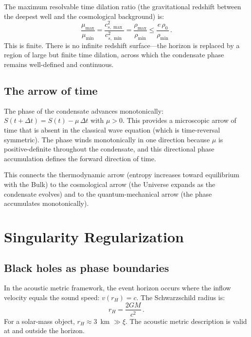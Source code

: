 \documentclass[12pt, a4paper]{article}
\begin{document}
The maximum resolvable time dilation ratio
(the gravitational redshift between the deepest
well and the cosmological background) is:
\begin{equation}
    \frac{\mu_{\max}}{\mu_{\min}}
    = \frac{c_{s,\max}^2}{c_{s,\min}^2}
    = \frac{\rho_{\max}}{\rho_{\min}}
    \leq \frac{e\,\rho_0}{\rho_{\min}}\,.
\label{eq:max_redshift}
\end{equation}
This is finite. There is no infinite redshift
surface---the horizon is replaced by a region of
large but finite time dilation, across which the
condensate phase remains well-defined and
continuous.

\subsection{The arrow of time}

The phase of the condensate advances monotonically:
$S(t+\Delta t) = S(t) - \mu\,\Delta t$ with
$\mu > 0$. This provides a microscopic arrow of
time that is absent in the classical wave equation
(which is time-reversal symmetric). The phase winds
monotonically in one direction because $\mu$ is
positive-definite throughout the condensate, and
this directional phase accumulation defines the
forward direction of time.

This connects the thermodynamic arrow (entropy
increases toward equilibrium with the Bulk) to
the cosmological arrow (the Universe expands as
the condensate evolves) and to the quantum-mechanical
arrow (the phase accumulates monotonically).

\section{Singularity Regularization}
\label{sec:singularity}

\subsection{Black holes as phase boundaries}

In the acoustic metric framework, the event horizon
occurs where the inflow velocity equals the sound
speed: $v(r_H) = c$. The Schwarzschild radius is:
\begin{equation}
    r_H = \frac{2GM}{c^2}\,.
\end{equation}
For a solar-mass object, $r_H \approx 3$~km $\gg \xi$.
The acoustic metric description is valid at and
outside the horizon.
\end{document}
